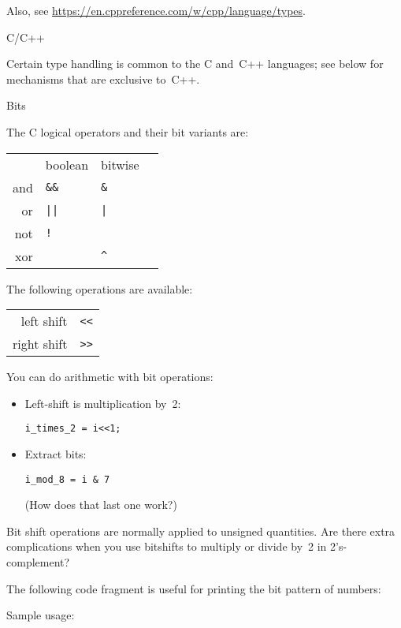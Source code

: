 Also, see \url{https://en.cppreference.com/w/cpp/language/types}.

 {C/C++}

Certain type handling is common to the C and~C++ languages;
see below for mechanisms that are exclusive to~C++.

 {Bits}

The C logical operators and their  bit variants are:

\begin{tabular}{rlll}
  \toprule
  &boolean&bitwise \\
  and&\verb+&&+ & \verb+&+ \\
  or &\verb+||+ & \verb+|+ \\
  not&\verb+!+  &          \\
  xor&          & \verb+^+ \\
  \bottomrule
\end{tabular}

The following  operations are available:

\begin{tabular}{rl}
  \toprule
  left  shift& \verb+<<+ \\
  right shift& \verb+>>+ \\
  \bottomrule
\end{tabular}

You can do arithmetic with bit operations:
  \begin{itemize}
  \item Left-shift is multiplication by~2:\\
\begin{lstlisting}
i_times_2 = i<<1;
\end{lstlisting}
\item Extract bits:
\begin{lstlisting}
i_mod_8 = i & 7
\end{lstlisting}
(How does that last one work?)
  \end{itemize}

\begin{exercise}
  Bit shift operations are normally applied to unsigned quantities.
  Are there extra complications when you use bitshifts to multiply or
  divide by~2 in 2's-complement?
\end{exercise}

The following code fragment is useful for printing the bit pattern of numbers:

Sample usage:

